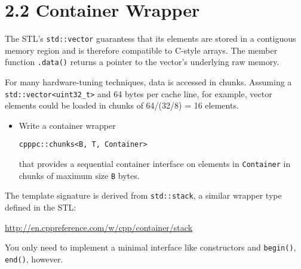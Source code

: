 \documentclass[]{article}
\begin{document}

\section{2.2 Container Wrapper}\label{container-wrapper}

The STL's \texttt{std::vector} guarantess that its elements are stored
in a contiguous memory region and is therefore compatible to C-style
arrays. The member function \texttt{.data()} returns a pointer to the
vector's underlying raw memory.

For many hardware-tuning techniques, data is accessed in chunks.
Assuming a \texttt{std::vector\textless{}uint32\_t\textgreater{}} and 64
bytes per cache line, for example, vector elements could be loaded in
chunks of 64/(32/8) = 16 elements.

\begin{itemize}
\item
  Write a container wrapper

\begin{verbatim}
cpppc::chunks<B, T, Container>
\end{verbatim}

  that provides a sequential container interface on elements in
  \texttt{Container} in chunks of maximum size \texttt{B} bytes.
\end{itemize}

The template signature is derived from \texttt{std::stack}, a similar
wrapper type defined in the STL:

\url{http://en.cppreference.com/w/cpp/container/stack}

You only need to implement a minimal interface like constructors and
\texttt{begin()}, \texttt{end()}, however.
\end{document}
